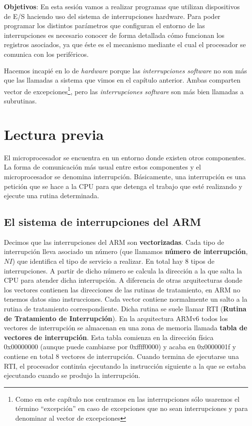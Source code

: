 

\label{chp:Interrupciones}
\minitoc

{\bf Objetivos}: En esta sesión vamos a realizar programas que
utilizan dispositivos de E/S haciendo uso del sistema de
interrupciones hardware. Para poder programar los distintos parámetros
que configuran el entorno de las interrupciones es necesario conocer de
forma detallada cómo funcionan los registros asociados, ya que
éste es el mecanismo mediante el cual el procesador se
comunica con los periféricos.

Hacemos incapié en lo de {\it hardware} porque las
{\it interrupciones software} no son más que las llamadas a sistema
que vimos en el capítulo anterior. Ambas comparten vector de excepciones\footnote{Como
en este capítulo nos centramos en las interrupciones sólo usaremos el término ``excepción'' en caso de excepciones
que no sean interrupciones y para denominar al vector de excepciones},
pero las {\it interrupciones software} son más bien llamadas a subrutinas.

\section{Lectura previa}

El microprocesador se encuentra en un entorno donde existen otros
componentes. La forma de comunicación más usual entre estos
componentes y el microprocesador se denomina interrupción.
Básicamente, una interrupción es una petición que se hace a la CPU
para que detenga el trabajo que esté realizando y ejecute una rutina
determinada. 

\subsection{El sistema de interrupciones del ARM}

Decimos que las interrupciones del ARM son {\bf vectorizadas}.
Cada tipo de interrupción lleva asociado un número (que llamamos
{\bf número de interrupción}, $NI$) que identifica el tipo de servicio a
realizar. En total hay 8 tipos de interrupciones.
A partir de dicho número se calcula la dirección a la que salta la CPU
para atender dicha interrupción. A diferencia de otras arquitecturas
donde los vectores contienen las direcciones de las rutinas de
tratamiento, en ARM no tenemos datos sino instrucciones. Cada vector
contiene normalmente un salto a la rutina de tratamiento correspondiente.
Dicha rutina se suele llamar RTI ({\bf Rutina
de Tratamiento de Interrupción}). En la arquitectura ARMv6
todos los vectores de interrupción se almacenan en una zona de memoria
llamada {\bf tabla de vectores de interrupción}. Esta tabla comienza
en la dirección física 0x00000000 (aunque puede cambiarse por
0xffff0000) y acaba en 0x0000001f y contiene en total 8 vectores de
interrupción. Cuando termina de ejecutarse una RTI,
el procesador continúa ejecutando la instrucción siguiente a la que se
estaba ejecutando cuando se produjo la interrupción.

